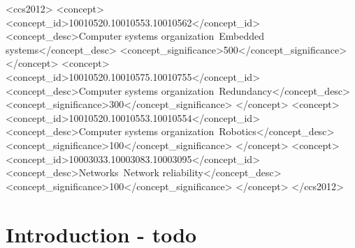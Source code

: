\documentclass[sigconf,screen]{acmart}
\begin{document}
%
%
\begin{CCSXML}
<ccs2012>
 <concept>
  <concept_id>10010520.10010553.10010562</concept_id>
  <concept_desc>Computer systems organization~Embedded systems</concept_desc>
  <concept_significance>500</concept_significance>
 </concept>
 <concept>
  <concept_id>10010520.10010575.10010755</concept_id>
  <concept_desc>Computer systems organization~Redundancy</concept_desc>
  <concept_significance>300</concept_significance>
 </concept>
 <concept>
  <concept_id>10010520.10010553.10010554</concept_id>
  <concept_desc>Computer systems organization~Robotics</concept_desc>
  <concept_significance>100</concept_significance>
 </concept>
 <concept>
  <concept_id>10003033.10003083.10003095</concept_id>
  <concept_desc>Networks~Network reliability</concept_desc>
  <concept_significance>100</concept_significance>
 </concept>
</ccs2012>
\end{CCSXML}


%

%

%
\maketitle

\section{Introduction - todo}
\end{document}

